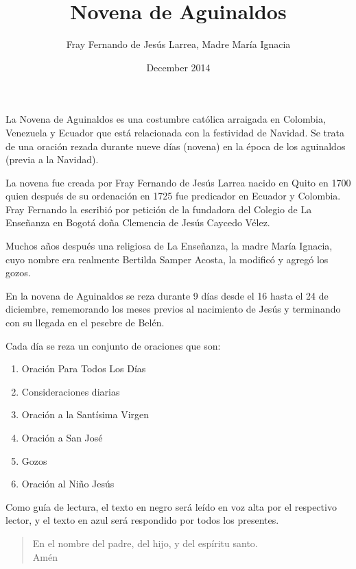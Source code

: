 \documentclass[spanish,utf8,twocolumn]{chlart}
\title{Novena de Aguinaldos}
\author{Fray Fernando de Jesús Larrea, Madre María Ignacia}
\date{December 2014}
\newenvironment{intro}{\begingroup
	\sffamily%
	\setlength{\leftskip}{2em}\setlength{\rightskip}{2em}\noindent
	}{\par\endgroup}
\newenvironment{gozo}{\begin{verse}\color{lector}}{\end{verse}}
\begin{document}
\color{notes}
\maketitle

\begin{intro}
La Novena de Aguinaldos es una costumbre católica arraigada en Colombia,
Venezuela y Ecuador que está relacionada con la festividad de Navidad.
Se trata de una oración rezada durante nueve días (novena) en la época
de los aguinaldos (previa a la Navidad).

La novena fue creada por Fray Fernando de Jesús Larrea nacido en Quito
en 1700 quien después de su ordenación en 1725 fue predicador en Ecuador
y Colombia.
Fray Fernando la escribió por petición de la fundadora del
Colegio de La Enseñanza en Bogotá doña Clemencia de Jesús Caycedo Vélez.

Muchos años después una religiosa de La Enseñanza, la madre María
Ignacia, cuyo nombre era realmente Bertilda Samper Acosta, la modificó
y agregó los gozos.

En la novena de Aguinaldos se reza durante 9 días desde el 16 hasta el
24 de diciembre, rememorando los meses previos al nacimiento de Jesús y
terminando con su llegada en el pesebre de Belén.

Cada día se reza un conjunto de oraciones que son:
\begin{enumerate}
  \item  Oración Para Todos Los Días
  \item  Consideraciones diarias
  \item  Oración a la Santísima Virgen
  \item  Oración a San José
  \item  Gozos
  \item  Oración al Niño Jesús
\end{enumerate}

Como guía de lectura, el texto en \textrm{\color{lector}negro} será
leído en voz alta por el respectivo lector, y el texto en
\textrm{\color{responden}azul} será respondido por todos los presentes.
\end{intro}

\begin{gozo}
En el nombre del padre, del hijo, y del espíritu santo.\\Amén
\end{gozo}
\end{document}
